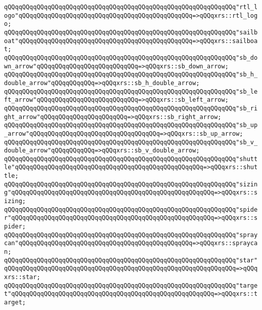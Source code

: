 \verb|qQQqqQQqqQQqqQQqqQQqqQQqqQQqqQQqqQQqqQQqqQQqqQQqqQQqqQQqqQQqqQQq"rtl_logo"qQQqqQQqqQQqqQQqqQQqqQQqqQQqqQQqqQQqqQQqqQQqqQQq=>qQQqxrs::rtl_logo;|\newline
\verb|qQQqqQQqqQQqqQQqqQQqqQQqqQQqqQQqqQQqqQQqqQQqqQQqqQQqqQQqqQQqqQQq"sailboat"qQQqqQQqqQQqqQQqqQQqqQQqqQQqqQQqqQQqqQQqqQQqqQQq=>qQQqxrs::sailboat;|\newline
\verb|qQQqqQQqqQQqqQQqqQQqqQQqqQQqqQQqqQQqqQQqqQQqqQQqqQQqqQQqqQQqqQQq"sb_down_arrow"qQQqqQQqqQQqqQQqqQQqqQQqqQQq=>qQQqxrs::sb_down_arrow;|\newline
\verb|qQQqqQQqqQQqqQQqqQQqqQQqqQQqqQQqqQQqqQQqqQQqqQQqqQQqqQQqqQQqqQQq"sb_h_double_arrow"qQQqqQQqqQQq=>qQQqxrs::sb_h_double_arrow;|\newline
\verb|qQQqqQQqqQQqqQQqqQQqqQQqqQQqqQQqqQQqqQQqqQQqqQQqqQQqqQQqqQQqqQQq"sb_left_arrow"qQQqqQQqqQQqqQQqqQQqqQQqqQQq=>qQQqxrs::sb_left_arrow;|\newline
\verb|qQQqqQQqqQQqqQQqqQQqqQQqqQQqqQQqqQQqqQQqqQQqqQQqqQQqqQQqqQQqqQQq"sb_right_arrow"qQQqqQQqqQQqqQQqqQQqqQQq=>qQQqxrs::sb_right_arrow;|\newline
\verb|qQQqqQQqqQQqqQQqqQQqqQQqqQQqqQQqqQQqqQQqqQQqqQQqqQQqqQQqqQQqqQQq"sb_up_arrow"qQQqqQQqqQQqqQQqqQQqqQQqqQQqqQQqqQQq=>qQQqxrs::sb_up_arrow;|\newline
\verb|qQQqqQQqqQQqqQQqqQQqqQQqqQQqqQQqqQQqqQQqqQQqqQQqqQQqqQQqqQQqqQQq"sb_v_double_arrow"qQQqqQQqqQQq=>qQQqxrs::sb_v_double_arrow;|\newline
\verb|qQQqqQQqqQQqqQQqqQQqqQQqqQQqqQQqqQQqqQQqqQQqqQQqqQQqqQQqqQQqqQQq"shuttle"qQQqqQQqqQQqqQQqqQQqqQQqqQQqqQQqqQQqqQQqqQQqqQQqqQQq=>qQQqxrs::shuttle;|\newline
\verb|qQQqqQQqqQQqqQQqqQQqqQQqqQQqqQQqqQQqqQQqqQQqqQQqqQQqqQQqqQQqqQQq"sizing"qQQqqQQqqQQqqQQqqQQqqQQqqQQqqQQqqQQqqQQqqQQqqQQqqQQqqQQq=>qQQqxrs::sizing;|\newline
\verb|qQQqqQQqqQQqqQQqqQQqqQQqqQQqqQQqqQQqqQQqqQQqqQQqqQQqqQQqqQQqqQQq"spider"qQQqqQQqqQQqqQQqqQQqqQQqqQQqqQQqqQQqqQQqqQQqqQQqqQQqqQQq=>qQQqxrs::spider;|\newline
\verb|qQQqqQQqqQQqqQQqqQQqqQQqqQQqqQQqqQQqqQQqqQQqqQQqqQQqqQQqqQQqqQQq"spraycan"qQQqqQQqqQQqqQQqqQQqqQQqqQQqqQQqqQQqqQQqqQQqqQQq=>qQQqxrs::spraycan;|\newline
\verb|qQQqqQQqqQQqqQQqqQQqqQQqqQQqqQQqqQQqqQQqqQQqqQQqqQQqqQQqqQQqqQQq"star"qQQqqQQqqQQqqQQqqQQqqQQqqQQqqQQqqQQqqQQqqQQqqQQqqQQqqQQqqQQqqQQq=>qQQqxrs::star;|\newline
\verb|qQQqqQQqqQQqqQQqqQQqqQQqqQQqqQQqqQQqqQQqqQQqqQQqqQQqqQQqqQQqqQQq"target"qQQqqQQqqQQqqQQqqQQqqQQqqQQqqQQqqQQqqQQqqQQqqQQqqQQqqQQq=>qQQqxrs::target;|\newline
